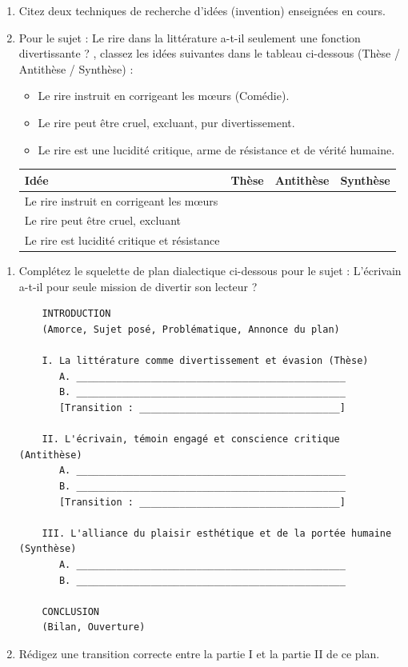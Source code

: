 \documentclass[11pt]{article}
\begin{document}
\begin{exercice}
\begin{enumerate}
    \item Citez deux techniques de recherche d'idées (invention) enseignées en cours.
    \item Pour le sujet : \og Le rire dans la littérature a-t-il seulement une fonction divertissante ? \fg{}, classez les idées suivantes dans le tableau ci-dessous (Thèse / Antithèse / Synthèse) :
    \begin{itemize}
        \item Le rire instruit en corrigeant les mœurs (Comédie).
        \item Le rire peut être cruel, excluant, pur divertissement.
        \item Le rire est une lucidité critique, arme de résistance et de vérité humaine.
    \end{itemize}
    \begin{tabular}{|l|c|c|c|}
    \hline
    Idée & Thèse & Antithèse & Synthèse \\ \hline
    Le rire instruit en corrigeant les mœurs & & & \\ \hline
    Le rire peut être cruel, excluant & & & \\ \hline
    Le rire est lucidité critique et résistance & & & \\ \hline
    \end{tabular}
\end{enumerate}
\end{exercice}

\begin{exercice}
\begin{enumerate}
    \item Complétez le squelette de plan dialectique ci-dessous pour le sujet : \og L'écrivain a-t-il pour seule mission de divertir son lecteur ? \fg{}
    \begin{verbatim}
    INTRODUCTION
    (Amorce, Sujet posé, Problématique, Annonce du plan)

    I. La littérature comme divertissement et évasion (Thèse)
       A. _______________________________________________
       B. _______________________________________________
       [Transition : ___________________________________]

    II. L'écrivain, témoin engagé et conscience critique (Antithèse)
       A. _______________________________________________
       B. _______________________________________________
       [Transition : ___________________________________]

    III. L'alliance du plaisir esthétique et de la portée humaine (Synthèse)
       A. _______________________________________________
       B. _______________________________________________

    CONCLUSION
    (Bilan, Ouverture)
    \end{verbatim}
    \item Rédigez une transition correcte entre la partie I et la partie II de ce plan.
\end{enumerate}
\end{exercice}
\end{document}
